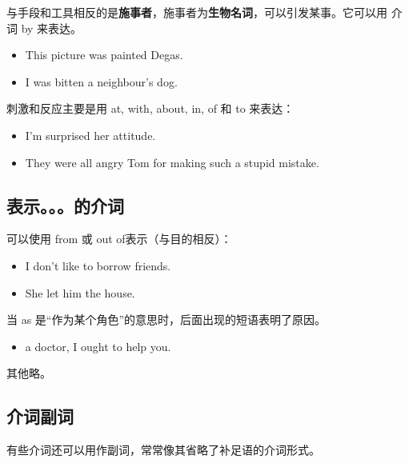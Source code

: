 与手段和工具相反的是\textbf{施事者}，施事者为\textbf{生物名词}，可以引发某事。它可以用
介词 by 来表达。
\begin{itemize}
\item This picture was painted  Degas.

\item I was bitten  a neighbour's dog.
\end{itemize}

刺激和反应主要是用 at, with, about, in, of 和 to 来表达：
\begin{itemize}
\item I'm surprised  her attitude.

\item They were all angry  Tom for making such a stupid mistake.

\end{itemize}

\subsection{表示。。。的介词}

可以使用 from 或 out of表示（与目的相反）：
\begin{itemize}
\item I don't like to borrow  friends.

\item She let him  the house.
\end{itemize}

当 as 是“作为某个角色”的意思时，后面出现的短语表明了原因。
\begin{itemize}
\item {} a doctor, I ought to help you.
\end{itemize}

其他略。

\subsection{介词副词}

有些介词还可以用作副词，常常像其省略了补足语的介词形式。



